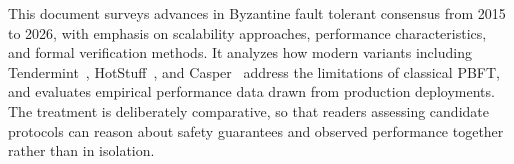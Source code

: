This document surveys advances in Byzantine fault tolerant consensus from 2015 to 2026, with emphasis on scalability approaches, performance characteristics, and formal verification methods. It analyzes how modern variants including Tendermint~\cite{buchman2016tendermint}, HotStuff~\cite{yin2019hotstuff}, and Casper~\cite{buterin2020combining} address the limitations of classical PBFT, and evaluates empirical performance data drawn from production deployments. The treatment is deliberately comparative, so that readers assessing candidate protocols can reason about safety guarantees and observed performance together rather than in isolation.